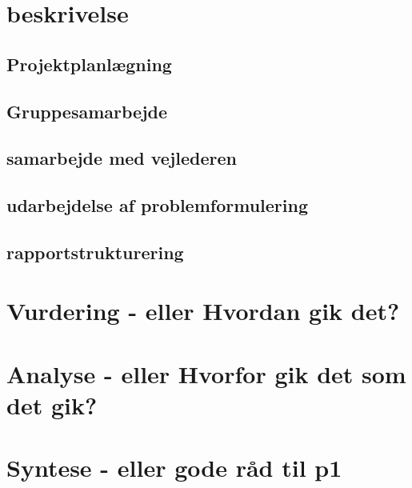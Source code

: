 



\section{beskrivelse}

\subsection{Projektplanlægning}


\subsection{Gruppesamarbejde}


\subsection{samarbejde med vejlederen}


\subsection{udarbejdelse af problemformulering}


\subsection{rapportstrukturering}


\section{Vurdering - eller Hvordan gik det?}



\section{Analyse - eller Hvorfor gik det som det gik?}



\section{Syntese - eller gode råd til p1}








